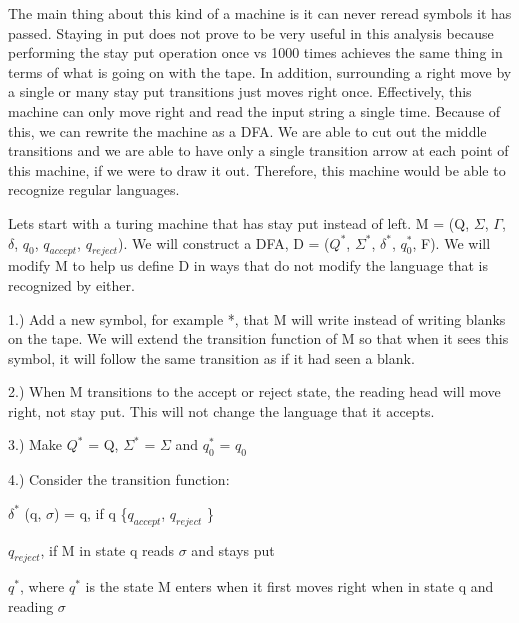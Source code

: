 \documentclass[12pt]{article}
\begin{document}
The main thing about this kind of a machine is it can never reread symbols it has passed. Staying in put does not prove to be very useful in this analysis because performing the stay put operation once vs 1000 times achieves the same thing in terms of what is going on with the tape. In addition, surrounding a right move by a single or many stay put transitions just moves right once. Effectively, this machine can only move right and read the input string a single time. Because of this, we can rewrite the machine as a DFA. We are able to cut out the middle transitions and we are able to have only a single transition arrow at each point of this machine, if we were to draw it out. Therefore, this machine would be able to recognize regular languages.

Lets start with a turing machine that has stay put instead of left. M = (Q, $\Sigma$, $\Gamma$, $\delta$, $q_0$, $q_{accept}$, $q_{reject}$). We will construct a DFA, D = ($Q^*$, $\Sigma^*$, $\delta^*$, $q_0^*$, F). We will modify M to help us define D in ways that do not modify the language that is recognized by either. 

1.) Add a new symbol, for example *, that M will write instead of writing blanks on the tape. We will extend the transition function of M so that when it sees this symbol, it will follow the same transition as if it had seen a blank. 

2.) When M transitions to the accept or reject state, the reading head will move right, not stay put. This will not change the language that it accepts.

3.) Make $Q^*$ = Q, $\Sigma^*$ = $\Sigma$ and $q_0^*$ = $q_0$

4.) Consider the transition function:


\setlength{\parindent}{20ex}
\indent $\delta^*$ (q, $\sigma$) = \setlength{\parindent}{9ex}q, \indent if q \in \{$q_{accept}$, $q_{reject}$ \}
\setlength{\parindent}{32ex}

\indent $q_{reject}$, \setlength{\parindent}{4ex}
\indent if M in state q reads $\sigma$ and stays put

\setlength{\parindent}{32ex}
$q^*$, \setlength{\parindent}{7ex}
\indent where $q^*$ is the state M enters when it first 
\setlength{\parindent}{44ex}
\indent moves right when in state q and reading $\sigma$
\end{document}
